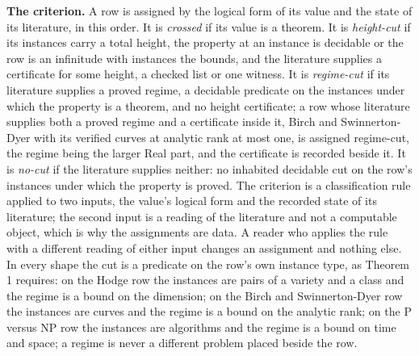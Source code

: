 \documentclass[10pt]{article}
\begin{document}
\textbf{The criterion.} A row is assigned by the logical form of its
value and the state of its literature, in this order. It is
\emph{crossed} if its value is a theorem. It is \emph{height-cut} if its
instances carry a total height, the property at an instance is decidable
or the row is an infinitude with instances the bounds, and the
literature supplies a certificate for some height, a checked list or one
witness. It is \emph{regime-cut} if its literature supplies a proved
regime, a decidable predicate on the instances under which the property
is a theorem, and no height certificate; a row whose literature supplies
both a proved regime and a certificate inside it, Birch and
Swinnerton-Dyer with its verified curves at analytic rank at most one,
is assigned regime-cut, the regime being the larger Real part, and the
certificate is recorded beside it. It is \emph{no-cut} if the literature
supplies neither: no inhabited decidable cut on the row's instances
under which the property is proved. The criterion is a classification
rule applied to two inputs, the value's logical form and the recorded
state of its literature; the second input is a reading of the literature
and not a computable object, which is why the assignments are data. A
reader who applies the rule with a different reading of either input
changes an assignment and nothing else. In every shape the cut is a
predicate on the row's own instance type, as Theorem 1 requires: on the
Hodge row the instances are pairs of a variety and a class and the
regime is a bound on the dimension; on the Birch and Swinnerton-Dyer row
the instances are curves and the regime is a bound on the analytic rank;
on the P versus NP row the instances are algorithms and the regime is a
bound on time and space; a regime is never a different problem placed
beside the row.
\end{document}
